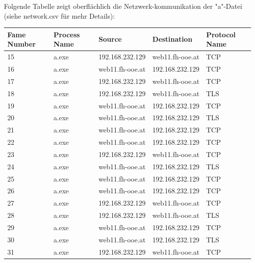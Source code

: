 \documentclass{article}
\begin{document}
	\pagebreak
	
	\noindent Folgende Tabelle zeigt oberflächlich die Netzwerk-kommunikation der "a"-Datei (siehe network.csv für mehr Details):\\
	\begin{table}[h]
		\centering
		\begin{tabular}{|m{1cm}|m{1.5cm}|m{3cm}|m{3cm}|m{1.4cm}|}
			\hline
			\textbf{Fame Number} & \textbf{Process Name} &          \textbf{Source} &    \textbf{Destination} & \textbf{Protocol Name} \\ \hline
			15 &        a.exe & 192.168.232.129 & web11.fh-ooe.at &           TCP \\ \hline
			16 &        a.exe & web11.fh-ooe.at & 192.168.232.129 &           TCP \\ \hline
			17 &        a.exe & 192.168.232.129 & web11.fh-ooe.at &           TCP \\ \hline
			18 &        a.exe & 192.168.232.129 & web11.fh-ooe.at &           TLS \\ \hline
			19 &        a.exe & web11.fh-ooe.at & 192.168.232.129 &           TCP \\ \hline
			20 &        a.exe & web11.fh-ooe.at & 192.168.232.129 &           TLS \\ \hline
			21 &        a.exe & web11.fh-ooe.at & 192.168.232.129 &           TCP \\ \hline
			22 &        a.exe & web11.fh-ooe.at & 192.168.232.129 &           TCP \\ \hline
			23 &        a.exe & 192.168.232.129 & web11.fh-ooe.at &           TCP \\ \hline
			24 &        a.exe & web11.fh-ooe.at & 192.168.232.129 &           TLS \\ \hline
			25 &        a.exe & web11.fh-ooe.at & 192.168.232.129 &           TCP \\ \hline
			26 &        a.exe & web11.fh-ooe.at & 192.168.232.129 &           TCP \\ \hline
			27 &        a.exe & 192.168.232.129 & web11.fh-ooe.at &           TCP \\ \hline
			28 &        a.exe & 192.168.232.129 & web11.fh-ooe.at &           TLS \\ \hline
			29 &        a.exe & web11.fh-ooe.at & 192.168.232.129 &           TCP \\ \hline
			30 &        a.exe & web11.fh-ooe.at & 192.168.232.129 &           TLS \\ \hline
			31 &        a.exe & 192.168.232.129 & web11.fh-ooe.at &           TCP \\ \hline

\end{tabular}
\end{table}
\end{document}
